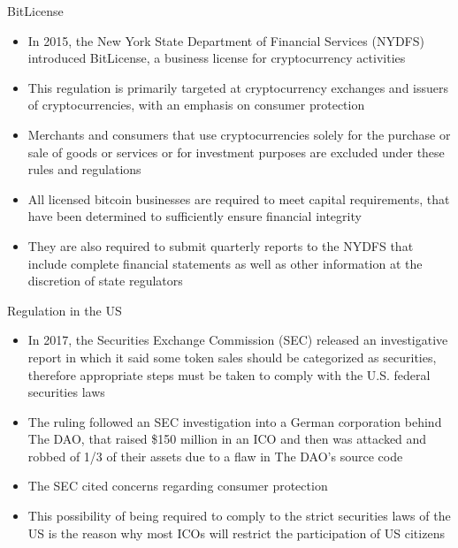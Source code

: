 \documentclass[11pt]{beamer}
\begin{document}

\begin{frame}{BitLicense}
	\begin{itemize}
		\item In 2015, the New York State Department of Financial Services (NYDFS) introduced BitLicense, a business license for cryptocurrency activities
		\item This regulation is primarily targeted at cryptocurrency exchanges and issuers of cryptocurrencies, with an emphasis on consumer protection
		\item Merchants and consumers that use cryptocurrencies solely for the purchase or sale of goods or services or for investment purposes are excluded under these rules and regulations
		\item All licensed bitcoin businesses are required to meet capital requirements, that have been determined to sufficiently ensure financial integrity
		\item They are also required to submit quarterly reports to the NYDFS that include complete financial statements as well as other information at the discretion of state regulators
	\end{itemize}
\end{frame}


\begin{frame}{Regulation in the US}
	\begin{itemize}
		\item In 2017, the Securities Exchange Commission (SEC) released an investigative report in which it said some token sales should be categorized as securities, therefore appropriate steps must be taken to comply with the U.S. federal securities laws
		\item The ruling followed an SEC investigation into a German corporation behind The DAO, that raised \$150 million in an ICO and then was attacked and robbed of 1/3 of their assets due to a flaw in The DAO's source code
		\item The SEC cited concerns regarding consumer protection
		\item This possibility of being required to comply to the strict securities laws of the US is the reason why most ICOs will restrict the participation of US citizens
	\end{itemize}
\end{frame}
\end{document}
